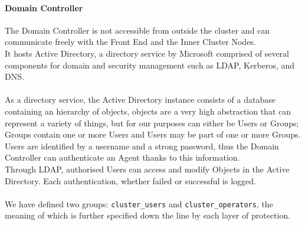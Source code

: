 \paragraph{Domain Controller}
The Domain Controller is not accessible from outside the cluster and can communicate freely with the Front End and the Inner Cluster Nodes.\\
It hosts Active Directory, a directory service by Microsoft comprised of several components for domain and security management such as LDAP, Kerberos, and DNS.\\ \\
As a directory service, the Active Directory instance consists of a database containing an hierarchy of objects, objects are a very high abstraction that can represent a variety of things, but for our purposes can either be Users or Groups; Groups contain one or more Users and Users may be part of one or more Groups. \\Users are identified by a username and a strong password, thus the Domain Controller can authenticate an Agent thanks to this information. \\
Through LDAP, authorised Users can access and modify Objects in the Active Directory. Each authentication, whether failed or successful is logged.\\ \\
We have defined two groups: \texttt{cluster\_users} and \texttt{cluster\_operators}, the meaning of which is further specified down the line by each layer of protection.

